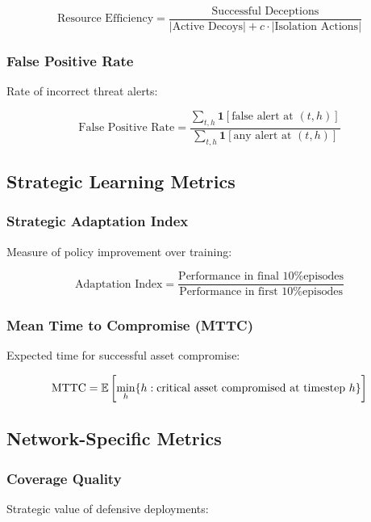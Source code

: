 \documentclass[12pt,oneside]{article}
\begin{document}
\begin{equation}
\text{Resource Efficiency} = \frac{\text{Successful Deceptions}}{|\text{Active Decoys}| + c \cdot |\text{Isolation Actions}|}
\end{equation}

\subsubsection{False Positive Rate}
Rate of incorrect threat alerts:

\begin{equation}
\text{False Positive Rate} = \frac{\sum_{t,h} \mathbf{1}[\text{false alert at } (t,h)]}{\sum_{t,h} \mathbf{1}[\text{any alert at } (t,h)]}
\end{equation}

\subsection{Strategic Learning Metrics}


\subsubsection{Strategic Adaptation Index}
Measure of policy improvement over training:

\begin{equation}
\text{Adaptation Index} = \frac{\text{Performance in final 10\% episodes}}{\text{Performance in first 10\% episodes}}
\end{equation}

\subsubsection{Mean Time to Compromise (MTTC)}
Expected time for successful asset compromise:

\begin{equation}
\text{MTTC} = \mathbb{E}\left[\min_h \{h : \text{critical asset compromised at timestep } h\}\right]
\end{equation}

\subsection{Network-Specific Metrics}

\subsubsection{Coverage Quality}
Strategic value of defensive deployments:
\end{document}
